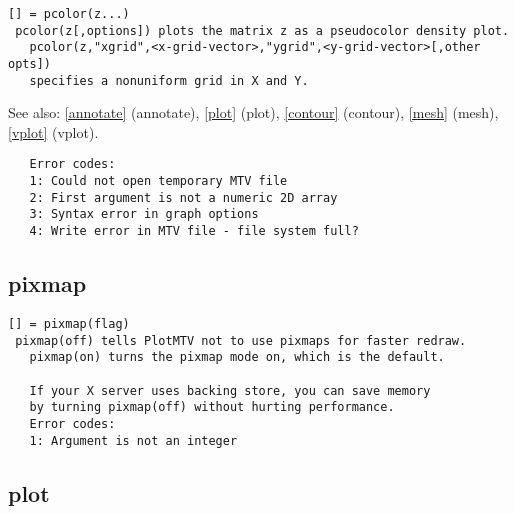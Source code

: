 \documentclass[a4paper]{article}
\begin{document}
\begin{tscreen}
\begin{verbatim}
[] = pcolor(z...)
 pcolor(z[,options]) plots the matrix z as a pseudocolor density plot.
   pcolor(z,"xgrid",<x-grid-vector>,"ygrid",<y-grid-vector>[,other opts])
   specifies a nonuniform grid in X and Y.
\end{verbatim}

See also: \ref{annotate} {(annotate)}, \ref{plot} {(plot)}, \ref{contour} {(contour)}, \ref{mesh} {(mesh)}, \ref{vplot} {(vplot)}.
\begin{verbatim}
   Error codes:
   1: Could not open temporary MTV file
   2: First argument is not a numeric 2D array
   3: Syntax error in graph options
   4: Write error in MTV file - file system full? 
\end{verbatim}
\end{tscreen}



\subsection{pixmap\label{pixmap}}

\begin{tscreen}
\begin{verbatim}
[] = pixmap(flag)
 pixmap(off) tells PlotMTV not to use pixmaps for faster redraw.
   pixmap(on) turns the pixmap mode on, which is the default.
   
   If your X server uses backing store, you can save memory
   by turning pixmap(off) without hurting performance.
   Error codes:
   1: Argument is not an integer 
\end{verbatim}
\end{tscreen}



\subsection{plot\label{plot}}
\end{document}
